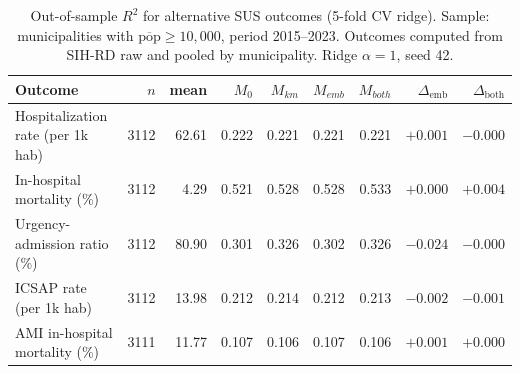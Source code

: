 \begin{table}[h!]
\centering
\caption{Out-of-sample $R^2$ for alternative SUS outcomes (5-fold CV ridge). Sample: municipalities with $\overline{\mathrm{pop}} \ge 10,000$, period 2015--2023. Outcomes computed from SIH-RD raw and pooled by municipality. Ridge $\alpha = 1$, seed 42.}
\label{tab:alt-outcomes}
\small
\begin{tabular}{lrrrrrrrr}
\toprule
Outcome & $n$ & mean & $M_0$ & $M_{km}$ & $M_{emb}$ & $M_{both}$ & $\Delta_{\mathrm{emb}}$ & $\Delta_{\mathrm{both}}$ \\
\midrule
Hospitalization rate (per 1k hab)        &  3112 &   62.61 & 0.222 & 0.221 & 0.221 & 0.221 & $+0.001$ & $-0.000$ \\
In-hospital mortality (\%)               &  3112 &    4.29 & 0.521 & 0.528 & 0.528 & 0.533 & $+0.000$ & $+0.004$ \\
Urgency-admission ratio (\%)             &  3112 &   80.90 & 0.301 & 0.326 & 0.302 & 0.326 & $-0.024$ & $-0.000$ \\
ICSAP rate (per 1k hab)                  &  3112 &   13.98 & 0.212 & 0.214 & 0.212 & 0.213 & $-0.002$ & $-0.001$ \\
AMI in-hospital mortality (\%)           &  3111 &   11.77 & 0.107 & 0.106 & 0.107 & 0.106 & $+0.001$ & $+0.000$ \\
\bottomrule
\end{tabular}
\end{table}
